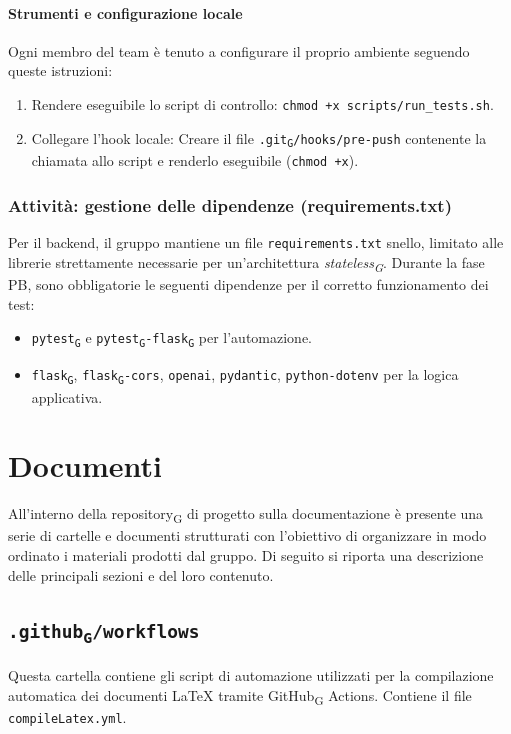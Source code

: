 \documentclass[11pt,a4paper]{article}
\newcommand{\gls}[1]{#1\textsubscript{G}}
\begin{document}
\paragraph{Strumenti e configurazione locale}
Ogni membro del team è tenuto a configurare il proprio ambiente seguendo queste istruzioni:
\begin{enumerate}
    \item Rendere eseguibile lo script di controllo: \texttt{chmod +x scripts/run\_tests.sh}.
    \item Collegare l'hook locale: Creare il file \texttt{.\gls{git}/hooks/pre-push} contenente la chiamata allo script e renderlo eseguibile (\texttt{chmod +x}).
\end{enumerate}

\subsubsection{Attività: gestione delle dipendenze (requirements.txt)}
Per il backend, il gruppo mantiene un file \texttt{requirements.txt} snello, limitato alle librerie strettamente necessarie per un'architettura \textit{\gls{stateless}}. Durante la fase PB, sono obbligatorie le seguenti dipendenze per il corretto funzionamento dei test:
\begin{itemize}
    \item \texttt{\gls{pytest}} e \texttt{\gls{pytest}-\gls{flask}} per l'automazione.
    \item \texttt{\gls{flask}}, \texttt{\gls{flask}-cors}, \texttt{openai}, \texttt{pydantic}, \texttt{python-dotenv} per la logica applicativa.
\end{itemize}  

\newpage

\section{Documenti}
All’interno della \gls{repository} di progetto sulla documentazione è presente una serie di cartelle e documenti strutturati con l’obiettivo di organizzare in modo ordinato i materiali prodotti dal gruppo. Di seguito si riporta una descrizione delle principali sezioni e del loro contenuto.

\subsection{\texttt{.\gls{github}/workflows}}
Questa cartella contiene gli script di automazione utilizzati per la compilazione automatica dei documenti LaTeX tramite \gls{GitHub} Actions. 
Contiene il file \texttt{compileLatex.yml}.
\end{document}
